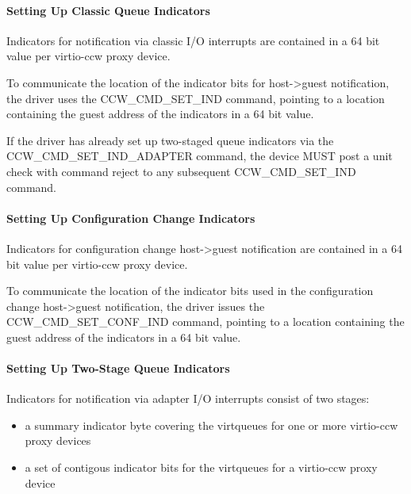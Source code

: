 \paragraph{Setting Up Classic Queue Indicators}\label{sec:Virtio Transport Options / Virtio over channel I/O / Device Initialization / Setting Up Indicators / Setting Up Classic Queue Indicators}

Indicators for notification via classic I/O interrupts are contained
in a 64 bit value per virtio-ccw proxy device.

To communicate the location of the indicator bits for host->guest
notification, the driver uses the CCW_CMD_SET_IND command,
pointing to a location containing the guest address of the
indicators in a 64 bit value.

If the driver has already set up two-staged queue indicators via the
CCW_CMD_SET_IND_ADAPTER command, the device MUST post a unit check
with command reject to any subsequent CCW_CMD_SET_IND command.

\paragraph{Setting Up Configuration Change Indicators}\label{sec:Virtio Transport Options / Virtio over channel I/O / Device Initialization / Setting Up Indicators / Setting Up Configuration Change Indicators}

Indicators for configuration change host->guest notification are
contained in a 64 bit value per virtio-ccw proxy device.

To communicate the location of the indicator bits used in the
configuration change host->guest notification, the driver issues the
CCW_CMD_SET_CONF_IND command, pointing to a location containing the
guest address of the indicators in a 64 bit value.

\paragraph{Setting Up Two-Stage Queue Indicators}\label{sec:Virtio Transport Options / Virtio over channel I/O / Device Initialization / Setting Up Indicators / Setting Up Two-Stage Queue Indicators}

Indicators for notification via adapter I/O interrupts consist of
two stages:
\begin{itemize}
\item a summary indicator byte covering the virtqueues for one or more
  virtio-ccw proxy devices
\item a set of contigous indicator bits for the virtqueues for a
  virtio-ccw proxy device
\end{itemize}

